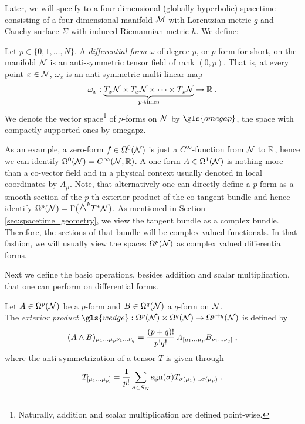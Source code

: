 Later, we will specify to a four dimensional (globally hyperbolic) spacetime consisting of a four dimensional manifold $\mathcal{M}$ with Lorentzian metric $g$ and Cauchy surface $\Sigma$ with induced Riemannian metric $h$.
%
We define:
\begin{definition}
	Let $p\in \{0,1,\dots,N\}$. A \emph{differential form} $\omega$ of degree $p$, or $p$-form for short, on the manifold $\mathcal{N}$ is an anti-symmetric tensor field of rank $(0,p)$. That is, at every point $x \in \mathcal{N}$, $\omega_x$ is an anti-symmetric multi-linear map
	\begin{align}
	\omega_x : \underbrace{T_x \mathcal{N} \times T_x \mathcal{N} \times \cdots \times T_x \mathcal{N}}_{p\text{-times}} \to \mathbb{R} \;.
	\end{align}
	We denote the vector space\footnote{Naturally, addition and scalar multiplication are defined point-wise.} of $p$-forms on $\mathcal{N}$ by $\gls{omegap}$, the space with compactly supported ones by \gls{omegapz}.
\end{definition}
As an example, a zero-form $f \in \Omega^0(\mathcal{N})$ is just a $C^\infty$-function from $\mathcal{N}$ to $\mathbb{R}$, hence we can identify $\Omega^0(\mathcal{N}) = C^\infty (\mathcal{N}, \mathbb{R})$. A one-form $A \in \Omega^1(\mathcal{N})$ is nothing more than a co-vector field and in a physical context usually denoted in local coordinates by $A_\mu$. Note, that alternatively one can directly define a $p$-form as a smooth section of the $p$-th exterior product of the co-tangent bundle and hence identify $\Omega^p(\mathcal{N}) = \Gamma \big( \mbox{\Large $\wedge$}^k T^*\mathcal{N}\big)$. As mentioned in Section \ref{sec:spacetime_geometry}, we view the tangent bundle as a complex bundle. Therefore, the sections of that bundle will be complex valued functionals. In that fashion, we will usually view the spaces $\Omega^p(\mathcal{N})$ as complex valued differential forms.\par
%
Next we define the basic operations, besides addition and scalar multiplication, that one can perform on differential forms.
%
\begin{definition}
	Let $A \in \Omega^p(\mathcal{N})$ be a $p$-form and  $B\in \Omega^q(\mathcal{N})$ a $q$-form on $\mathcal{N}$. \\
	The \emph{exterior product} $\gls{wedge}:\Omega^p(\N) \times \Omega^q(\N) \to \Omega^{p+q} (\N)$ is defined by
	\begin{align}
	(A \wedge B)_{\mu_1\dots\mu_p \nu_1\dots\nu_q} = \frac{(p+q)!}{p!q!}\, A_{[\mu_1 \dots \mu_p} B_{\nu_1\dots\nu_q]} \;,
	\end{align}
	where the anti-symmetrization of a tensor $T$ is given through
	\begin{align}
	T_{[\mu_1\dots\mu_p]} = \frac{1}{p!} \sum\limits_{\sigma\in S_N }\textrm{sgn}(\sigma) T_{\sigma(\mu_1)\dots\sigma(\mu_p)} \;.
	\end{align}
\end{definition}
